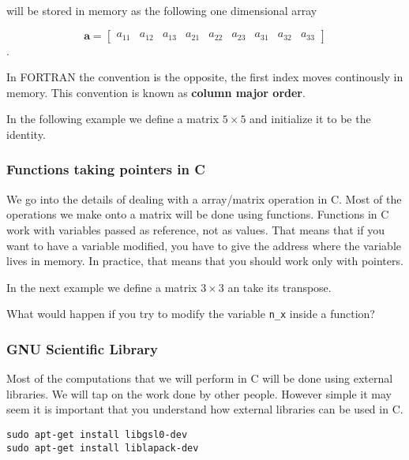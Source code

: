 \documentclass{article}
\begin{document}
will be stored in memory as the following one dimensional array

\begin{displaymath}
\mathbf{a} = 
\left[
\begin{array}{ccccccccc}
a_{11}  & a_{12} & a_{13}   & a_{21}  & a_{22}   & a_{23}  & a_{31}  & a_{32} & a_{33}   
\end{array}
\right]
\end{displaymath}.

In FORTRAN the convention is the opposite, the first index moves continously in memory. This convention is known as {\bf column major order}. 

In the following example we define a matrix $5\times 5$ and initialize it to be 
the identity.




\subsubsection{Functions taking pointers in C}
We go into the details of dealing with a array/matrix operation in C. Most of the operations we make onto a matrix will be done using functions. Functions in C work with variables passed as reference, not as values. That means that if you want to have a variable modified, you have to give the address where the variable lives in memory. In practice, that means that you should work only with pointers.


In the next example we define a matrix $3\times3$ an take its transpose.



What would happen if you try to modify the variable \verb"n_x" inside a function?

\subsubsection{GNU Scientific Library}

Most of the computations that we will perform in C will be done using
external libraries. We will tap on the work done by other
people. However simple it may seem it is important that you understand
how external libraries can be used in C.  

\begin{verbatim}
sudo apt-get install libgsl0-dev
sudo apt-get install liblapack-dev
\end{verbatim}
\end{document}
